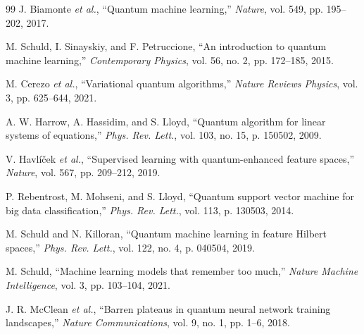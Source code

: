 \documentclass[11pt]{article}
\begin{document}
\begin{thebibliography}{99}
 J. Biamonte \textit{et al.}, ``Quantum machine learning,'' \textit{Nature}, vol. 549, pp. 195–202, 2017.

 M. Schuld, I. Sinayskiy, and F. Petruccione, ``An introduction to quantum machine learning,'' \textit{Contemporary Physics}, vol. 56, no. 2, pp. 172–185, 2015.

 M. Cerezo \textit{et al.}, ``Variational quantum algorithms,'' \textit{Nature Reviews Physics}, vol. 3, pp. 625–644, 2021.

 A. W. Harrow, A. Hassidim, and S. Lloyd, ``Quantum algorithm for linear systems of equations,'' \textit{Phys. Rev. Lett.}, vol. 103, no. 15, p. 150502, 2009.

 V. Havlíček \textit{et al.}, ``Supervised learning with quantum-enhanced feature spaces,'' \textit{Nature}, vol. 567, pp. 209–212, 2019.

 P. Rebentrost, M. Mohseni, and S. Lloyd, ``Quantum support vector machine for big data classification,'' \textit{Phys. Rev. Lett.}, vol. 113, p. 130503, 2014.

 M. Schuld and N. Killoran, ``Quantum machine learning in feature Hilbert spaces,'' \textit{Phys. Rev. Lett.}, vol. 122, no. 4, p. 040504, 2019.

 M. Schuld, ``Machine learning models that remember too much,'' \textit{Nature Machine Intelligence}, vol. 3, pp. 103–104, 2021.

 J. R. McClean \textit{et al.}, ``Barren plateaus in quantum neural network training landscapes,'' \textit{Nature Communications}, vol. 9, no. 1, pp. 1–6, 2018.
\end{thebibliography}
\end{document}
